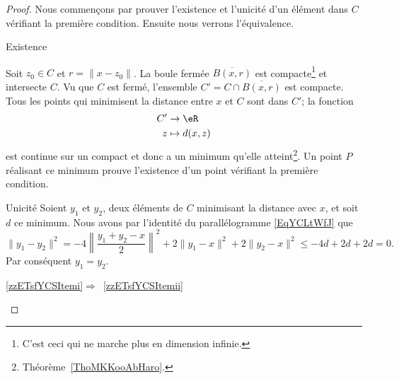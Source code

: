\begin{proof}
    Nous commençons par prouver l'existence et l'unicité d'un élément dans \( C\) vérifiant la première condition. Ensuite nous verrons l'équivalence.

    \begin{subproof}
        \item[Existence]

            Soit \( z_0\in C\) et \( r=\| x-z_0 \|\). La boule fermée \( \overline{ B(x,r) }\) est compacte\footnote{C'est ceci qui ne marche plus en dimension infinie.} et intersecte \( C\). Vu que \( C\) est fermé, l'ensemble \( C'=C\cap\overline{ B(x,r) }\) est compacte. Tous les points qui minimisent la distance entre \( x\) et \( C\) sont dans \( C'\); la fonction
            \begin{equation}
                \begin{aligned}
                     C'&\to \eR \\
                    z&\mapsto d(x,z)
                \end{aligned}
            \end{equation}
            est continue sur un compact et donc a un minimum qu'elle atteint\footnote{Théorème~\ref{ThoMKKooAbHaro}.}. Un point \( P\) réalisant ce minimum prouve l'existence d'un point vérifiant la première condition.

        \item[Unicité]
            Soient \( y_1\) et \( y_2\), deux éléments de \( C\) minimisant la distance avec \( x\), et soit \( d\) ce minimum. Nous avons par l'identité du parallélogramme \eqref{EqYCLtWfJ} que
            \begin{equation}
                \| y_1-y_2 \|^2=-4\left\| \frac{ y_1+y_2-x }{2} \right\|^2+2\| y_1-x \|^2+2\| y_2-x \|^2\leq -4d+2d+2d=0.
            \end{equation}
            Par conséquent \( y_1=y_2\).

        \item[\ref{zzETsfYCSItemi}\( \Rightarrow\)~\ref{zzETsfYCSItemii}]


\end{subproof}
\end{proof}
